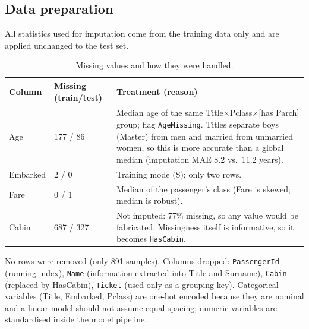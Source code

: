 \documentclass[10pt,twocolumn]{article}
\begin{document}
\subsection{Data preparation}
All statistics used for imputation come from the training data only and are applied unchanged to the test set.
\begin{table}[t]
\centering\small
\caption{Missing values and how they were handled.}
\label{tab:missing}
\begin{tabular}{p{1.0cm}p{1.2cm}p{4.6cm}}
\toprule
Column & Missing (train/test) & Treatment (reason) \\
\midrule
Age & 177 / 86 & Median age of the same Title$\times$Pclass$\times$[has Parch] group; flag \texttt{AgeMissing}. Titles separate boys (Master) from men and married from unmarried women, so this is more accurate than a global median (imputation MAE 8.2 vs.\ 11.2 years). \\
Embarked & 2 / 0 & Training mode (S); only two rows. \\
Fare & 0 / 1 & Median of the passenger's class (Fare is skewed; median is robust). \\
Cabin & 687 / 327 & Not imputed: 77\% missing, so any value would be fabricated. Missingness itself is informative, so it becomes \texttt{HasCabin}. \\
\bottomrule
\end{tabular}
\end{table}
No rows were removed (only 891 samples). Columns dropped: \texttt{PassengerId} (running index), \texttt{Name} (information extracted into Title and Surname), \texttt{Cabin} (replaced by HasCabin), \texttt{Ticket} (used only as a grouping key). Categorical variables (Title, Embarked, Pclass) are one-hot encoded because they are nominal and a linear model should not assume equal spacing; numeric variables are standardised inside the model pipeline.
\end{document}
